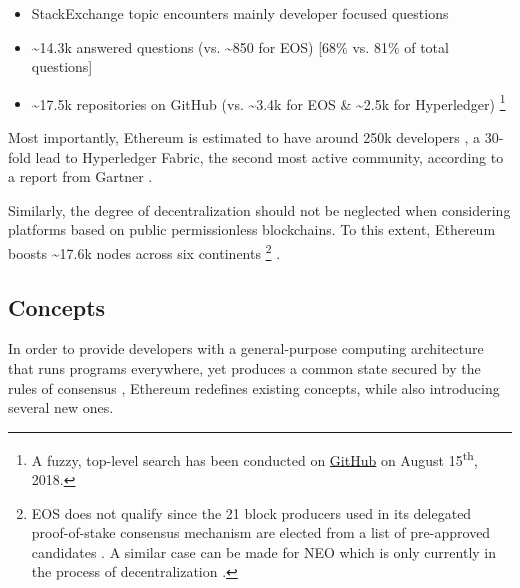\begin{itemize}
  \item StackExchange topic encounters mainly developer focused questions \cite[p.~6]{blockchainTechnologyGrowth}
  \item \textasciitilde 14.3k answered questions (vs. \textasciitilde 850 for EOS) [68\% vs. 81\% of total questions] \cite{stackExchangeTechnology}
  \item \textasciitilde17.5k repositories on GitHub (vs. \textasciitilde3.4k for EOS \& \textasciitilde2.5k for Hyperledger)  \footnote{A fuzzy, top-level search has been conducted on \href{https://github.com/search?q=ethereum}{GitHub} on August 15\textsuperscript{th}, 2018.}
\end{itemize}

Most importantly, Ethereum is estimated to have around 250k developers \cite{ethereumNetworkState}, a 30-fold lead to Hyperledger Fabric, the second most active community, according to a report from Gartner \cite{bloomberg2017}. 

Similarly, the degree of decentralization should not be neglected when considering platforms based on public permissionless blockchains. To this extent, Ethereum boosts \textasciitilde17.6k nodes across six continents \footnote{EOS does not qualify since the 21 block producers used in its delegated proof-of-stake consensus mechanism are elected from a list of pre-approved candidates \cite[p.~6]{eosWhitepaper} \cite{eosBlockproducers}. A similar case can be made for NEO which is only currently in the process of decentralization \cite{neoDecentralization} \cite{neoConsensus}.} \cite{ethernodes}.  



\subsection{Concepts}
In order to provide developers with a general-purpose computing architecture that runs programs everywhere, yet produces a common state secured by the rules of consensus \cite[p.~31]{Antonopoulos.2018}, Ethereum redefines existing concepts, while also introducing several new ones.

